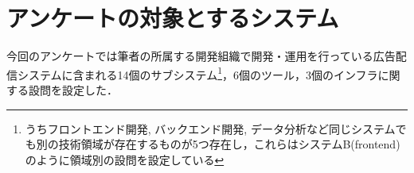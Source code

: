\section{アンケートの対象とするシステム}
今回のアンケートでは筆者の所属する開発組織で開発・運用を行っている広告配信システムに含まれる14個のサブシステム\footnote{うちフロントエンド開発, バックエンド開発, データ分析など同じシステムでも別の技術領域が存在するものが5つ存在し，これらはシステムB(frontend)のように領域別の設問を設定している}，6個のツール，3個のインフラに関する設問を設定した．


